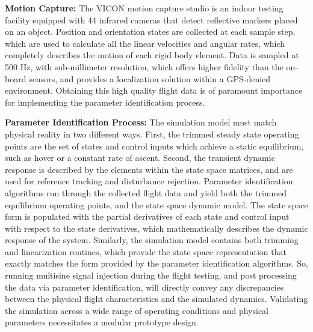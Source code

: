 \documentclass[11pt]{article}
\begin{document}
{\bf Motion Capture:}
The VICON motion capture studio is an indoor testing facility equipped with 44 infrared cameras that detect reflective markers placed on an object.  Position and orientation states are collected at each sample step, which are used to calculate all the linear velocities and angular rates, which completely describes the motion of each rigid body element.  Data is sampled at 500 Hz, with sub-millimeter resolution, which offers higher fidelity than the on-board sensors, and provides a localization solution within a GPS-denied environment.  Obtaining this high quality flight data is of paramount importance for implementing the parameter identification process.


{\bf Parameter Identification Process:}
The simulation model must match physical reality in two different ways.  First, the trimmed steady state operating points are the set of states and control inputs which achieve a static equilibrium, such as hover or a constant rate of ascent.  Second, the transient dynamic response is described by the elements within the state space matrices, and are used for reference tracking and disturbance rejection.  Parameter identification algorithms run through the collected flight data and yield both the trimmed equilibrium operating points, and the state space dynamic model.  The state space form is populated with the partial derivatives of each state and control input with respect to the state derivatives, which mathematically describes the dynamic response of the system.  Similarly, the simulation model contains both trimming and linearization routines, which provide the state space representation that exactly matches the form provided by the parameter identification algorithms.  So, running multisine signal injection during the flight testing, and post processing the data via parameter identification, will directly convey any discrepancies between the physical flight characteristics and the simulated dynamics.  Validating the simulation across a wide range of operating conditions and physical parameters necessitates a modular prototype design.
\end{document}
